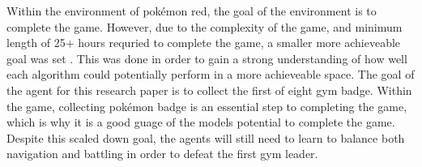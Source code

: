 Within the environment of pokémon red, the goal of the environment is to complete the game. However, due to the complexity of the game, and minimum length of 25+ hours requried to complete the game, a smaller more achieveable goal was set \cite{howlongtobeat}. This was done in order to gain a strong understanding of how well each algorithm could potentially perform in a more achieveable space. The goal of the agent for this research paper is to collect the first of eight gym badge. Within the game, collecting pokémon badge is an essential step to completing the game, which is why it is a good guage of the models potential to complete the game. Despite this scaled down goal, the agents will still need to learn to balance both navigation and battling in order to defeat the first gym leader.
